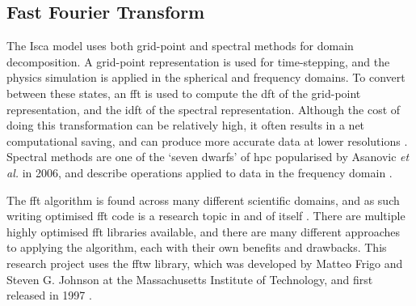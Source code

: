 \documentclass[a4paper,11pt]{report}
\begin{document}
\subsection{Fast Fourier Transform}
The Isca model uses both grid-point and spectral methods for domain decomposition. A grid-point representation is used for time-stepping, and the physics simulation is applied in the spherical and frequency domains. To convert between these states, an \gls{fft} is used to compute the \gls{dft} of the grid-point representation, and the \gls{idft} of the spectral representation. Although the cost of doing this transformation can be relatively high, it often results in a net computational saving, and can produce more accurate data at lower resolutions \cite{bader2008climate}. Spectral methods are one of the `seven dwarfs' of \gls{hpc} popularised by Asanovic \textit{et al.} in 2006, and describe operations applied to data in the frequency domain \cite{asanovic2006landscape} .
\par
The \gls{fft} algorithm is found across many different scientific domains, and as such writing optimised \gls{fft} code is a research topic in and of itself \cite{singleton1967method, cooley1965algorithm, sorensen1987real}. There are multiple highly optimised \gls{fft} libraries available, and there are many different approaches to applying the algorithm, each with their own benefits and drawbacks. This research project uses the \gls{fftw} library, which was developed by Matteo Frigo and Steven G. Johnson at the Massachusetts Institute of Technology, and first released in 1997 \cite{frigo1998fftw}. 
\end{document}
